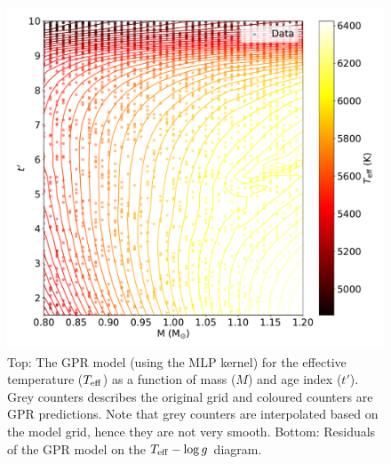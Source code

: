 \begin{figure}
	\includegraphics[width=1.0\columnwidth]{2d_gpmodel_MLP.pdf}
    \caption{Top: The GPR model (using the MLP kernel) for the effective temperature ($T_{\rm eff}$) as a function of mass ($M$) and age index ($t'$). Grey counters describes the original grid and coloured counters are GPR predictions. Note that grey counters are interpolated based on the model grid, hence they are not very smooth. Bottom: Residuals of the GPR model on the $T_{\rm eff} - \log g$ diagram.}  
    \label{fig:gpmodel}
\end{figure}

